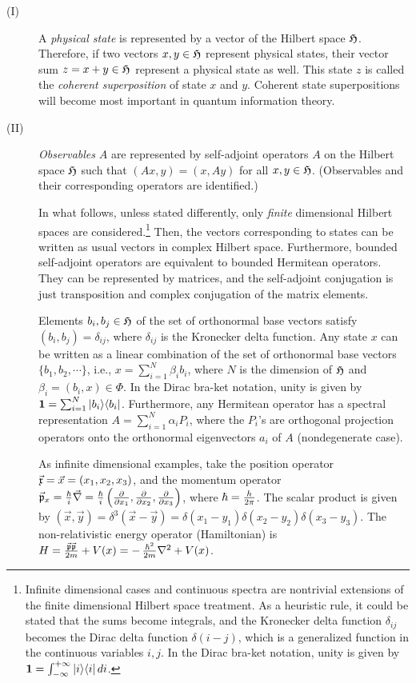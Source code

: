 \begin{description}
\item[(I)]
 A {\em physical state} is represented by
a  vector of  the Hilbert space ${\cal H} $.
Therefore, if two vectors $x,y\in {\cal H}$ represent physical
states, their vector sum
$z=x+y\in{\cal H}$ represent a physical state as well.
This state $z$ is called the {\em coherent superposition} of state $x$
and
$y$. Coherent state superpositions will become most important in quantum
information theory.

\item[(II)]
{\em Observables} $A$ are represented by self-adjoint
operators $A$
on the Hilbert space ${\cal H}$ such that $(Ax,y)=(x,Ay)$ for all
$x,y\in {\cal H}$. (Observables and their corresponding operators are
identified.)

In what follows, unless stated differently, only
{\em finite} dimensional Hilbert spaces are considered.\footnote{
Infinite dimensional cases and continuous spectra are nontrivial
extensions of the finite
dimensional Hilbert space treatment. As a heuristic rule, it could be
stated that the sums become integrals, and the Kronecker delta function
$\delta_{ij}$
becomes the Dirac delta function $\delta (i-j)$, which is a
generalized function in the continuous variables $i,j$.
In the Dirac bra-ket notation, unity is given by
${\bf 1}=\int_{-\infty}^{+\infty} \vert i\rangle \langle i\vert \, di$.}
 Then, the vectors
corresponding to states can be written as usual vectors in complex
Hilbert space.
Furthermore, bounded
self-adjoint operators are  equivalent to bounded Hermitean operators.
They can be represented by matrices, and the self-adjoint
conjugation
is just transposition and complex conjugation of the matrix elements.

Elements $b_i,b_j\in {\cal H}$ of the set of orthonormal base vectors
satisfy
$(b_i, b_j) =\delta_{ij}$,
where $\delta_{ij}$ is the Kronecker delta function.
Any state $x$ can be written as a linear
combination of
the set of orthonormal base vectors $\{b_1,b_2,\cdots \}$,
i.e.,
$x =\sum_{i=1}^N   \beta_i b_i$, where $N$ is the dimension of ${\cal
H}$ and
$\beta_i=(b_i,x) \in \Phi$.
In the Dirac bra-ket notation, unity is given by
${\bf 1}=\sum_{i=1}^N \vert b_i\rangle \langle b_i\vert $.
Furthermore,
any Hermitean operator has a spectral representation
$A=\sum_{i=1}^N \alpha_i P_i$,
where the $P_i$'s  are orthogonal projection operators onto the
orthonormal eigenvectors $a_i$ of $A$ (nondegenerate
case).

As  infinite dimensional examples, take the
position operator  ${\vec {\frak x}}={\vec x}=(x_1,x_2,x_3)$, and the
momentum operator
${\vec {\frak p}_x}=
{\hbar \over i} {\vec \nabla}=
{\hbar \over i} \left(
{\partial \over \partial x_1},
{\partial \over \partial x_2},
{\partial \over \partial x_3}\right)
$, where $\hbar ={h\over 2\pi
}$. The scalar product is given by
$(
{\vec x},
{\vec y})=\delta^3 ({\vec x}-{\vec y})=
\delta(x_1-y_1)
\delta(x_2-y_2)
\delta(x_3-y_3)$.
The non-relativistic energy operator (Hamiltonian) is
${H}={{{\vec {\frak p}}} {{\vec {\frak p}}}\over
2m}+{V}(x)=
-\,
{\hbar^2
\over
2m}\nabla^2+V(x)$.


\end{description}

